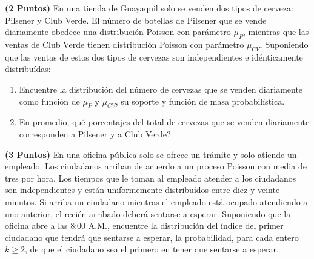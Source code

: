 \documentclass[ a4paper, twoside, 11pt]{article}
\begin{document}
\begin{problem}
\textbf{(2 Puntos)} En una tienda de Guayaquil solo se venden dos tipos de cerveza: Pilsener y Club Verde. El n\'umero de botellas de Pilsener que se vende diariamente obedece una distribuci\'on Poisson con par\'ametro $\mu_P$, mientras que las ventas de Club Verde tienen distribuci\'on Poisson con par\'ametro $\mu_{CV}$. Suponiendo que las ventas de estos dos tipos de cervezas son independientes e id\'enticamente distribu\'idas: 
\begin{enumerate}[label=\alph*)]
\item Encuentre la distribuci\'on del n\'umero de cervezas que se venden diariamente como funci\'on de $\mu_{P}$ y $\mu_{CV}$, \ie su soporte y funci\'on de masa probabil\'istica. 
\item En promedio, qu\'e porcentajes del total de cervezas que se venden diariamente corresponden a Pilsener y a Club Verde? 
\end{enumerate}

\end{problem}
\vspace{\baselineskip}

\begin{problem}
\textbf{(3 Puntos)} En una oficina p\'ublica solo se ofrece un tr\'amite y solo atiende un empleado. Los ciudadanos arriban de acuerdo a un proceso Poisson con media de tres por hora. \linebreak Los tiempos que le toman al empleado atender a los ciudadanos son independientes y est\'an uniformemente distribu\'idos entre diez y veinte minutos. Si arriba un ciudadano mientras el empleado est\'a ocupado atendiendo a uno anterior, el reci\'en arribado deber\'a sentarse a esperar.  Suponiendo que la oficina abre a las 8:00 A.M., encuentre la distribuci\'on del \'indice del primer ciudadano que tendr\'a que sentarse a esperar, \ie la probabilidad, para cada entero $k \geq 2$, \linebreak de que el \kavo ciudadano sea el primero en tener que sentarse a esperar. 

\end{problem}
\vspace{\baselineskip}
\end{document}
